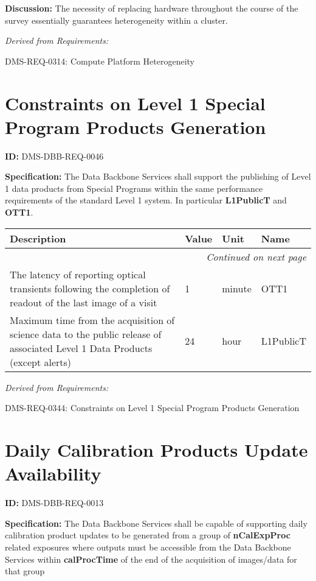 \documentclass[SE,toc,lsstdraft]{lsstdoc}
\makeatletter
\newcommand{\paramname}[1]{\hspace{0pt}#1}
\newcommand{\unitname}[1]{\hspace{0pt}#1}
\newenvironment{parameters}[0]{%
\setlength\LTleft{0pt}
\setlength\LTright{\fill}
\begin{small}
\begin{longtable}[]{|p{0.49\textwidth}|l|p{0.6in}|p{1.70in}@{}|}

\hline \textbf{Description} & \textbf{Value} & \textbf{Unit} & \textbf{Name} \\ \hline
\endhead

\hline \multicolumn{4}{r}{\emph{Continued on next page}} \\
\endfoot

\hline\hline
\endlastfoot
}{%
\hline
\end{longtable}
\end{small}
}
\makeatother
\begin{document}
\textbf{Discussion:}
The necessity of replacing hardware throughout the course of the survey essentially guarantees heterogeneity within a cluster.

\emph{Derived from Requirements:}

DMS-REQ-0314:
Compute Platform Heterogeneity \newline

\section{Constraints on Level 1 Special Program Products Generation}

\label{DMS-DBB-REQ-0046}
\textbf{ID:} DMS-DBB-REQ-0046

\textbf{Specification:}
The Data Backbone Services shall support the publishing of Level 1 data products from Special Programs within the same performance requirements of the standard Level 1 system. In particular \textbf{L1PublicT} and \textbf{OTT1}.

\begin{parameters}
The latency of reporting optical transients following the completion of readout of the last image of a visit
&
1
&
\unitname{%
minute
}
&
\paramname{%
OTT1
} \\\hline
Maximum time from the acquisition of science data to the public release of associated Level 1 Data Products (except alerts)
&
24
&
\unitname{%
hour
}
&
\paramname{%
L1PublicT
} \\\hline
\end{parameters}

\emph{Derived from Requirements:}

DMS-REQ-0344:
Constraints on Level 1 Special Program Products Generation \newline

\section{Daily Calibration Products Update Availability}

\label{DMS-DBB-REQ-0013}
\textbf{ID:} DMS-DBB-REQ-0013

\textbf{Specification:}
The Data Backbone Services shall be capable of supporting daily calibration product updates to be generated from a group of \textbf{nCalExpProc} related exposures where outputs must be accessible from the Data Backbone Services within \textbf{calProcTime} of the end of the acquisition of images/data for that group
\end{document}
